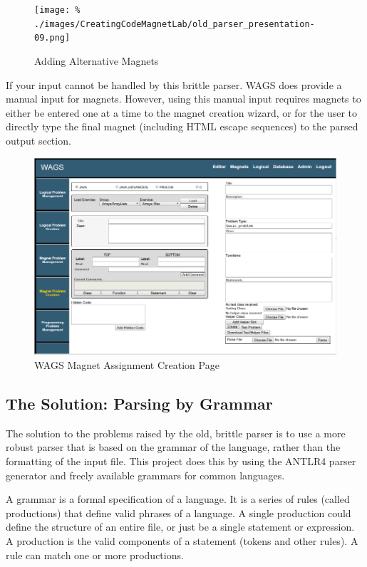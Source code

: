 \documentclass[letter,10pt]{article}
\begin{document}
\begin{figure}[h!]
 \centering
 
 \texttt{[image: \%
./images/CreatingCodeMagnetLab/old\_parser\_presentation-09.png]}
 \caption{Adding Alternative Magnets}
 \label{fig:old_parser_alts}
\end{figure}

If your input cannot be handled by this brittle parser. WAGS does 
provide a manual input for magnets. However, using this manual input 
requires magnets to either be entered one at a time to the magnet 
creation wizard, or for the user to directly type the final magnet 
(including HTML escape sequences) to the parsed output section. 

\begin{figure}[h!]
 \centering
 \includegraphics{./images/wags-magnet-creation.png}
 \caption{WAGS Magnet Assignment Creation Page}
 \label{fig:wags-magnet-creation}
\end{figure}


\subsection{The Solution: Parsing by Grammar}

The solution to the problems raised by the old, brittle parser is to 
use a more robust parser that is based on the grammar of the language, 
rather than the formatting of the input file. This project does this by 
using the ANTLR4 parser generator\cite{antlr-reference} and freely 
available grammars for common languages\cite{antlr-grammars-project}.

A grammar is a formal specification of a language. It is a series of 
rules (called productions) that define valid phrases of a language. A 
single production could define the structure of an entire file, or just 
be a single statement or expression. A production is the valid 
components of a statement (tokens and other rules). A rule can match 
one or more productions.
\end{document}
